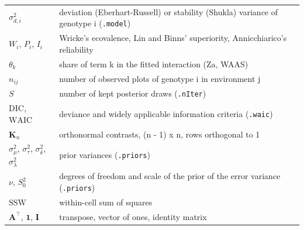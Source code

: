 \begin{longtable}{>{\raggedright\arraybackslash}p{}>{\raggedright\arraybackslash}p{}}
$\sigma^2_{d,i}$ & deviation (Eberhart-Russell) or stability (Shukla) variance of genotype i (\texttt{.model})\\
$W_i$, $P_i$, $I_i$ & Wricke's ecovalence, Lin and Binns' superiority, Annicchiarico's reliability\\
$\theta_k$ & share of term k in the fitted interaction (Za, WAAS)\\
$n_{ij}$ & number of observed plots of genotype i in environment j\\
$S$ & number of kept posterior draws (\texttt{.nIter})\\
$\mathrm{DIC}$, $\mathrm{WAIC}$ & deviance and widely applicable information criteria (\texttt{.waic})\\
$\mathbf{K}_n$ & orthonormal contrasts, (n - 1) x n, rows orthogonal to 1\\
$\sigma^2_\mu$, $\sigma^2_\tau$, $\sigma^2_\delta$, $\sigma^2_\lambda$ & prior variances (\texttt{.priors})\\
$\nu$, $S^2_0$ & degrees of freedom and scale of the prior of the error variance (\texttt{.priors})\\
$\mathrm{SSW}$ & within-cell sum of squares\\
$\mathbf{A}^\top$, $\mathbf{1}$, $\mathbf{I}$ & transpose, vector of ones, identity matrix\\
\bottomrule
\end{longtable}
